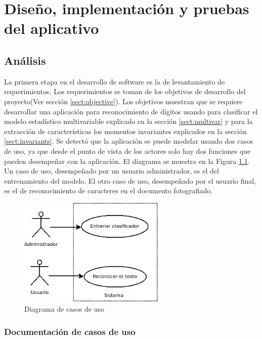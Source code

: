 \documentclass[a4paper, 11pt, oneside]{report}
\begin{document}
\chapter{Diseño, implementación y pruebas del aplicativo}
\label{chap:ingSw}

\section{Análisis}

La primera etapa en el desarrollo de software es la de levantamiento de requerimientos. Los requerimientos se toman de los objetivos de desarrollo del proyecto(Ver sección \ref{sect:objective}). Los objetivos muestran que se requiere desarrollar una aplicación para reconocimiento de dígitos usando para clasificar el modelo estadístico multivariable explicado en la sección \ref{sect:multivar} y para la extracción de características los momentos invariantes explicados en la sección \ref{sect:invariants}.\newline \newline
Se detectó que la aplicación se puede modelar usando dos casos de uso, ya que desde el punto de vista de los actores solo hay dos funciones que pueden desempeñar con la aplicación. El diagrama se muestra en la Figura \ref{fig:useCase}. Un caso de uso, desempeñado por un usuario administrador, es el del entrenamiento del modelo. El otro caso de uso, desempeñado por el usuario final, es el de reconocimiento de caracteres en el documento fotografiado.

\begin{figure}[htb]
\begin{center}
\leavevmode
\includegraphics[width=7cm]{diagrams/casoUso.jpg}
\end{center}
\caption{Diagrama de casos de uso}
\label{fig:useCase}
\end{figure}

\subsection{Documentación de casos de uso}
\end{document}
